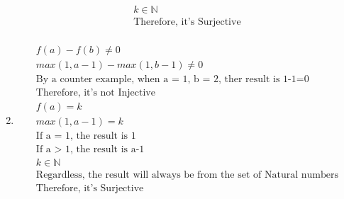 \documentclass[12pt]{article}
\begin{document}
\begin{enumerate}
\begin{equation*}
\begin{split}
			k \in \mathbb{N}\\
			\text{Therefore, it's Surjective}\\
	    	\end{split}
	    \end{equation*}
	\item 
	    \begin{equation*}
	    	\begin{split}
	    		f(a) - f(b) \ne 0\\
			max(1, a-1) - max(1, b-1) \ne 0\\
			\text{By a counter example, when a = 1, b = 2, ther result is 1-1=0}\\
			\text{Therefore, it's not Injective}\\
			f(a) = k\\
			max(1, a-1) = k\\
			\text{If a = 1, the result is 1}\\
			\text{If a > 1, the result is a-1}\\
			k \in \mathbb{N}\\
			\text{Regardless, the result will always be from the set of Natural numbers}\\
			\text{Therefore, it's Surjective}\\
	    	\end{split}
	    \end{equation*}
\end{enumerate}
\end{document}
